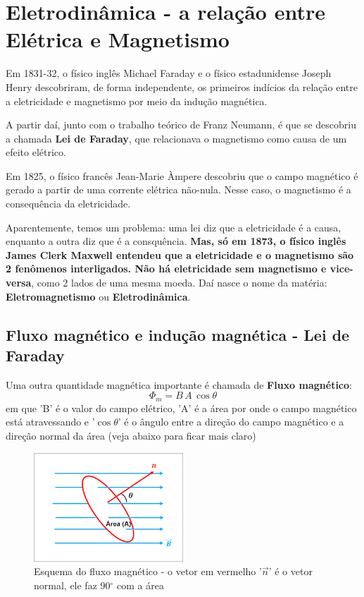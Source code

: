 \documentclass[12pt]{extarticle}
\newcommand{\<}{\langle}
\renewcommand{\>}{\rangle}
\theoremstyle{definition}
\begin{document}
\section{Eletrodinâmica - a relação entre Elétrica e Magnetismo}

Em 1831-32, o físico inglês Michael Faraday e o físico estadunidense Joseph Henry descobriram, de forma independente, os primeiros indícios da relação entre a eletricidade e magnetismo por meio da indução magnética.

A partir daí, junto com o trabalho teórico de Franz Neumann, é que se descobriu a chamada \textbf{Lei de Faraday}, que relacionava o magnetismo como causa de um efeito elétrico.

Em 1825, o físico francês Jean-Marie Àmpere descobriu que o campo magnético é gerado a partir de uma corrente elétrica não-nula. Nesse caso, o magnetismo é a consequência da eletricidade.

Aparentemente, temos um problema: uma lei diz que a eletricidade é a causa, enquanto a outra diz que é a consquência. \textbf{Mas, só em 1873, o físico inglês James Clerk Maxwell entendeu que a eletricidade e o magnetismo são 2 fenômenos interligados. Não há eletricidade sem magnetismo e vice-versa}, como 2 lados de uma mesma moeda. Daí nasce o nome da matéria: \textbf{Eletromagnetismo} ou \textbf{Eletrodinâmica}.

\subsection{Fluxo magnético e indução magnética - Lei de Faraday}

Uma outra quantidade magnética importante é chamada de \textbf{Fluxo magnético}:
\begin{equation}
    \Phi_m = B\,A\,\cos\theta
\end{equation}
\noindent em que 'B' é o valor do campo elétrico, 'A' é a área por onde o campo magnético está atravessando e '$\cos\theta$' é o ângulo entre a direção do campo magnético e a direção normal da área (veja abaixo para ficar mais claro)
\begin{figure}[H]
    \centering
    \includegraphics[width=0.5\textwidth]{indução 1.png}
    \caption{Esquema do fluxo magnético - o vetor em vermelho '$\vec{n}$' é o vetor normal, ele faz 90$^\circ$ com a área}
    \label{fig:my_label}
\end{figure}
\end{document}
